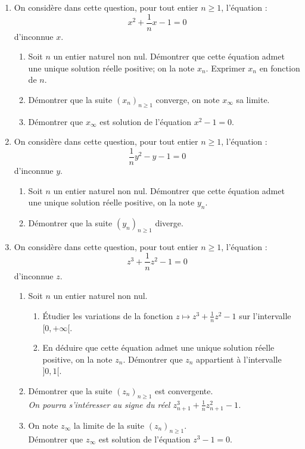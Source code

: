 \documentclass[landscape,twocolumn,leqno,a4paper,10pt]{report} %
\renewcommand{\geq}{\geqslant}
\begin{document}
\begin{enumerate}
	\item On considère dans cette question, pour tout entier $n \geq 1$, l'équation :
$$x^{2}+\frac{1}{n} x-1=0$$
d'inconnue $x$.
	\begin{enumerate}
		\item Soit $n$ un entier naturel non nul. Démontrer que cette équation admet une unique solution réelle positive; on la note $x_{n}$. Exprimer $x_{n}$ en fonction de $n$.
		\item Démontrer que la suite $\left(x_{n}\right)_{n \geq 1}$ converge, on note $x_{\infty}$ sa limite.
		\item Démontrer que $x_{\infty}$ est solution de l'équation $x^{2}-1=0$.
	\end{enumerate}
	\item On considère dans cette question, pour tout entier $n \geq 1$, l'équation :
	$$\frac{1}{n} y^{2}-y-1=0$$
	d'inconnue $y$.
	\begin{enumerate}
		\item Soit $n$ un entier naturel non nul. Démontrer que cette équation admet une unique solution réelle positive, on la note $y_{n}$.
		\item Démontrer que la suite $\left(y_{n}\right)_{n \geq 1}$ diverge.
	\end{enumerate}
	\item On considère dans cette question, pour tout entier $n \geq 1$, l'équation :
	$$z^{3}+\frac{1}{n} z^{2}-1=0$$
	d'inconnue $z$.
	\begin{enumerate}
		\item Soit $n$ un entier naturel non nul.
		\begin{enumerate}
			\item Étudier les variations de la fonction $z\mapsto z^3+\frac{1}{n}z^2-1$ sur l'intervalle $[0,+\infty[$.
			\item En déduire que cette équation admet une unique solution réelle positive, on la note $z_{n}$. Démontrer que $z_{n}$ appartient à l'intervalle $]0,1[$.
		\end{enumerate}
		\item Démontrer que la suite $\left(z_{n}\right)_{n \geq 1}$ est convergente.\\
		\textit{On pourra s'intéresser au signe du réel \quad $z_{n+1}^{3}+\frac{1}{n} z_{n+1}^{2}-1$.}
		\item On note $z_{\infty}$ la limite de la suite $\left(z_{n}\right)_{n \geq 1}$.\\
		Démontrer que $z_{\infty}$ est solution de l'équation $z^{3}-1=0$.

\end{enumerate}
\end{enumerate}
\end{document}
